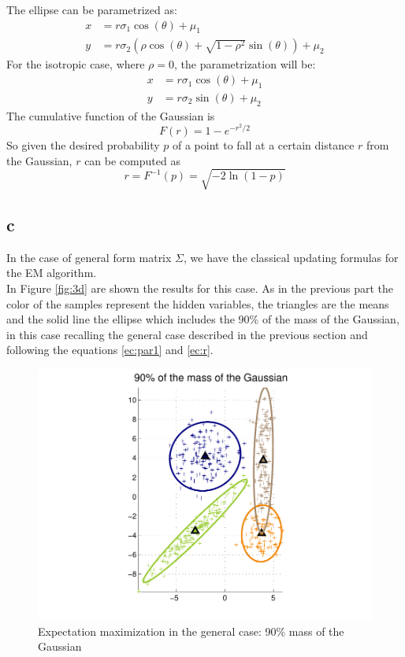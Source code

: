 \documentclass[12pt]{article}
\begin{document}
The ellipse can be parametrized as:
\begin{align}
\label{ec:par1}x & = r\sigma_1 \cos(\theta) +\mu_1 \\
\nonumber y & = r\sigma_2 (\rho \cos(\theta)+\sqrt{1-\rho^2}\sin(\theta) )+\mu_2
\end{align}
For the isotropic case, where $\rho=0$, the parametrization will be:
\begin{align}
\nonumber x & = r\sigma_1 \cos(\theta) +\mu_1 \\
\nonumber y & = r\sigma_2 \sin(\theta) +\mu_2
\end{align}
The cumulative function of the Gaussian is $$F(r) = 1-e^{-r^2/2}$$ So given the desired probability $p$ of a point to fall at a certain distance $r$ from the Gaussian, $r$ can be computed as 
\begin{equation}
	r= F^{-1}(p)=\sqrt{-2\ln (1-p)}
	\label{ec:r}
\end{equation}

\subsection*{c}
In the case of general form matrix $\Sigma$, we have the classical updating formulas for the EM algorithm.\\

In Figure \ref{fig:3d} are shown the results for this case. As in the previous part the color of the samples represent the hidden variables, the triangles are the means and the solid line the ellipse which includes the 90\% of the mass of the Gaussian, in this case recalling the general case described in the previous section and following the equations \ref{ec:par1} and \ref{ec:r}.

\begin{figure}[h!]
	\centering 
	\includegraphics[width=.8\textwidth]{./pics/3c.pdf}
	\caption{Expectation maximization in the general case: 90\% mass of the Gaussian}
	\label{fig:3c}
\end{figure}
\end{document}
